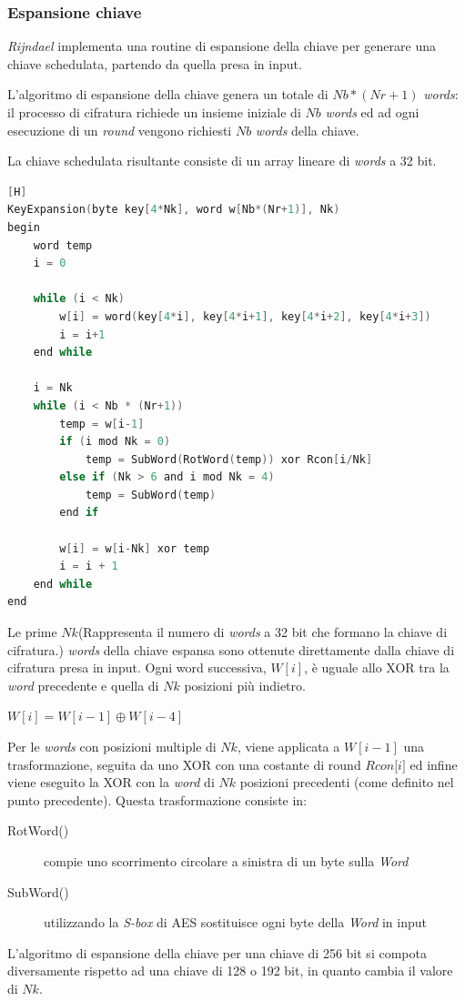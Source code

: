\documentclass[a4paper,11pt]{article}
\begin{document}
\subsubsection{Espansione chiave}
\textit{Rijndael} implementa una routine di espansione della chiave per generare una chiave schedulata, partendo da quella presa in input.

L'algoritmo di espansione della chiave genera un totale di $Nb * (Nr +1)$ \textit{words}: il processo di cifratura richiede un insieme iniziale di $Nb$ \textit{words} ed ad ogni esecuzione di un \textit{round} vengono richiesti $Nb$ \textit{words} della chiave.

La chiave schedulata risultante consiste di un array lineare di \textit{words} a 32 bit.

\begin{lstlisting}[language=c, caption={Pseudo Code for the Key Expansion}, frame=single][H]
KeyExpansion(byte key[4*Nk], word w[Nb*(Nr+1)], Nk)
begin
    word temp
    i = 0

    while (i < Nk)
        w[i] = word(key[4*i], key[4*i+1], key[4*i+2], key[4*i+3])
        i = i+1
    end while
    
    i = Nk
    while (i < Nb * (Nr+1))
        temp = w[i-1]
        if (i mod Nk = 0)
            temp = SubWord(RotWord(temp)) xor Rcon[i/Nk]
        else if (Nk > 6 and i mod Nk = 4)
            temp = SubWord(temp)
        end if
        
        w[i] = w[i-Nk] xor temp
        i = i + 1
    end while
end
\end{lstlisting}
\bigbreak
Le prime $Nk$(Rappresenta il numero di \textit{words} a 32 bit che formano la chiave di cifratura.) \textit{words} della chiave espansa sono ottenute direttamente dalla chiave di cifratura presa in input.
\bigbreak
Ogni word successiva, $W[i]$, è uguale allo XOR tra la \textit{word} precedente e quella di $Nk$ posizioni più indietro.
\begin{center}
    $W[i] = W[i-1] \oplus W[i-4]$
\end{center}
\bigbreak
Per le \textit{words} con posizioni multiple di $Nk$, viene applicata a $W[i-1]$ una trasformazione, seguita da uno XOR con una costante di round $\textit{Rcon[i]}$ ed infine viene eseguito la XOR con la \textit{word} di $Nk$ posizioni precedenti (come definito nel punto precedente).
\bigbreak
Questa trasformazione consiste in:
\begin{description}
    \item[RotWord()] compie uno scorrimento circolare a sinistra di un byte sulla \textit{Word}
    \item[SubWord()] utilizzando la \textit{S-box} di AES sostituisce ogni byte della \textit{Word} in input 
\end{description}
\bigbreak
L'algoritmo di espansione della chiave per una chiave di 256 bit  si compota diversamente rispetto ad una chiave di 128 o 192 bit, in quanto cambia il valore di $Nk$.
\end{document}
